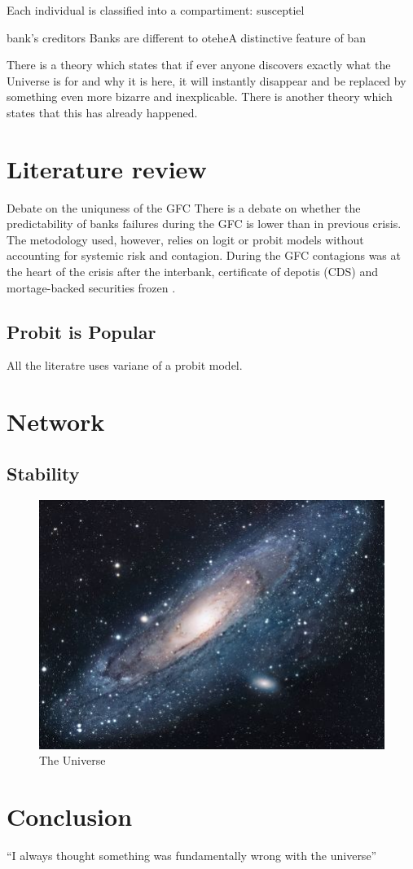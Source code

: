 \documentclass[11pt,final]{article}%
\begin{document}
Each individual is classified into a compartiment: susceptiel

bank's creditors Banks are different to oteheA distinctive feature of ban

There is a theory which states that if ever anyone discovers exactly what the Universe is for and why it is here, it will instantly disappear and be replaced by something even more bizarre and inexplicable.
There is another theory which states that this has already happened.

\section{Literature review}

Debate on the uniquness of the GFC
There is a debate on whether the predictability of banks failures during the GFC is lower than in previous crisis. The metodology used, however, relies on logit or probit models without accounting for systemic risk and contagion. 
During the GFC contagions was at the heart of the crisis after the interbank, certificate of depotis (CDS) and mortage-backed securities frozen \cite{GortonMetrick2012}.
\subsection{Probit is Popular}
All the literatre uses variane of a probit model.

\section{Network}
\subsection{Stability}


\begin{figure}[h!]
\centering
\includegraphics[scale=1.7]{universe}
\caption{The Universe}
\label{fig:universe}
\end{figure}

\section{Conclusion}
``I always thought something was fundamentally wrong with the universe'' \citep{adams1995hitchhiker}



\end{document}
